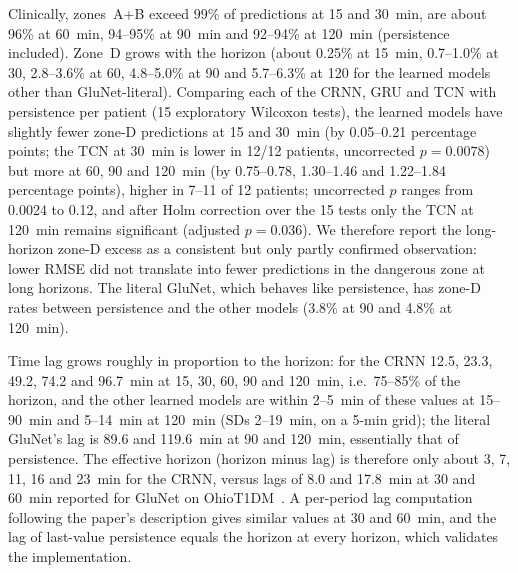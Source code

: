 \documentclass[conference]{IEEEtran}
\begin{document}
Clinically, zones~A+B exceed 99\% of predictions at 15 and 30~min, are about 96\% at 60~min, 94--95\% at 90~min and 92--94\% at 120~min (persistence included). Zone~D grows with the horizon (about 0.25\% at 15~min, 0.7--1.0\% at 30, 2.8--3.6\% at 60, 4.8--5.0\% at 90 and 5.7--6.3\% at 120 for the learned models other than GluNet-literal). Comparing each of the CRNN, GRU and TCN with persistence per patient (15 exploratory Wilcoxon tests), the learned models have slightly fewer zone-D predictions at 15 and 30~min (by 0.05--0.21 percentage points; the TCN at 30~min is lower in 12/12 patients, uncorrected $p=0.0078$) but more at 60, 90 and 120~min (by 0.75--0.78, 1.30--1.46 and 1.22--1.84 percentage points), higher in 7--11 of 12 patients; uncorrected $p$ ranges from 0.0024 to 0.12, and after Holm correction over the 15 tests only the TCN at 120~min remains significant (adjusted $p=0.036$). We therefore report the long-horizon zone-D excess as a consistent but only partly confirmed observation: lower RMSE did not translate into fewer predictions in the dangerous zone at long horizons. The literal GluNet, which behaves like persistence, has zone-D rates between persistence and the other models (3.8\% at 90 and 4.8\% at 120~min).

Time lag grows roughly in proportion to the horizon: for the CRNN 12.5, 23.3, 49.2, 74.2 and 96.7~min at 15, 30, 60, 90 and 120~min, i.e.\ 75--85\% of the horizon, and the other learned models are within 2--5~min of these values at 15--90~min and 5--14~min at 120~min (SDs 2--19~min, on a 5-min grid); the literal GluNet's lag is 89.6 and 119.6~min at 90 and 120~min, essentially that of persistence. The effective horizon (horizon minus lag) is therefore only about 3, 7, 11, 16 and 23~min for the CRNN, versus lags of 8.0 and 17.8~min at 30 and 60~min reported for GluNet on OhioT1DM~\cite{glunet}. A per-period lag computation following the paper's description gives similar values at 30 and 60~min, and the lag of last-value persistence equals the horizon at every horizon, which validates the implementation.
\end{document}
